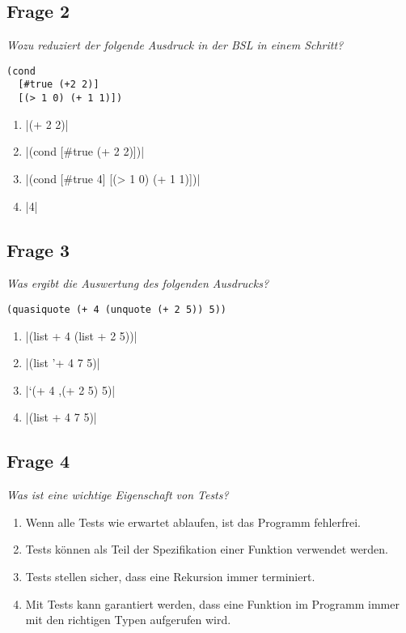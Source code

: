 \documentclass[a4paper, 11pt]{article}
\begin{document}
\subsection*{Frage 2}
\textit{Wozu reduziert der folgende Ausdruck in der BSL in einem Schritt?}
\begin{verbatim}
(cond
  [#true (+2 2)]
  [(> 1 0) (+ 1 1)])
\end{verbatim}
\begin{enumerate}[label=$\square$]
	\item {}|(+ 2 2)|
	\item {}|(cond [#true (+ 2 2)])|
	\item {}|(cond [#true 4] [(> 1 0) (+ 1 1)])|
	\item {}|4|
\end{enumerate}

\subsection*{Frage 3}
\textit{Was ergibt die Auswertung des folgenden Ausdrucks?}
\begin{verbatim}
(quasiquote (+ 4 (unquote (+ 2 5)) 5))
\end{verbatim}
\begin{enumerate}[label=$\square$]
	\item {}|(list + 4 (list + 2 5))|
	\item {}|(list '+ 4 7 5)|
	\item {}|`(+ 4 ,(+ 2 5) 5)|
	\item {}|(list + 4 7 5)|
\end{enumerate}

\subsection*{Frage 4}
\textit{Was ist eine wichtige Eigenschaft von Tests?}
\begin{enumerate}[label=$\square$]
	\item Wenn alle Tests wie erwartet ablaufen, ist das Programm fehlerfrei.
	\item Tests können als Teil der Spezifikation einer Funktion verwendet werden.
	\item Tests stellen sicher, dass eine Rekursion immer terminiert.
	\item Mit Tests kann garantiert werden, dass eine Funktion im Programm immer mit den richtigen Typen aufgerufen wird.
\end{enumerate}
\end{document}
